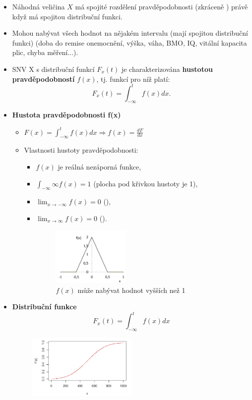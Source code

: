 \begin{itemize}
		\item Náhodná veličina $X$ má spojité rozdělení pravděpodobnosti (zkráceně ) právě když má spojitou distribuční funkci.
		\item Mohou nabývat všech hodnot na nějakém intervalu (mají spojitou distribuční funkci) (doba do remise onemocnění, výška, váha, BMO, IQ, vitální kapacita plic, chyba měření...).
		\item SNV X s distribuční funkcí $F_x(t)$ je charakterizována \textbf{hustotou pravděpodobností} $f(x)$, tj. funkcí pro níž platí:
		\begin{equation*}
				F_x(t) = \int_{-\infty}^{t} f(x) dx.
		\end{equation*}
		\item \textbf{Hustota pravděpodobnosti f(x)}
		\begin{itemize}
			\item $F(x) = \int_{-\infty}^{t} f(x) dx \Rightarrow f(x) = \frac{dF}{dx}$
			\item Vlastnosti hustoty pravděpodobnosti:
			\begin{itemize}
				\item[] $f(x)$ je reálná nezáporná funkce,
				\item[] $\int_{-\infty}{\infty} f(x) = 1$ (plocha pod křivkou hustoty je 1), 
				\item[] $\lim_{x \to -\infty} f(x) = 0$ (),
				\item[] $\lim_{x \to \infty} f(x) = 0$ ().
				\begin{figure}[H]
					\centering
					\includegraphics[width=0.4\textwidth]{assets/11_snv_muze}
					\caption{$f(x)$ může nabývat hodnot vyšších než 1}
				\end{figure}
			\end{itemize}
		\end{itemize}
		\item \textbf{Distribuční funkce}
		$$F_x(t) = \int_{-\infty}^{t} f(x) dx$$
		\begin{figure}[H]
			\centering
			\includegraphics[width=0.5\textwidth]{assets/11_dist_fce_snv}

\end{figure}
\end{itemize}
